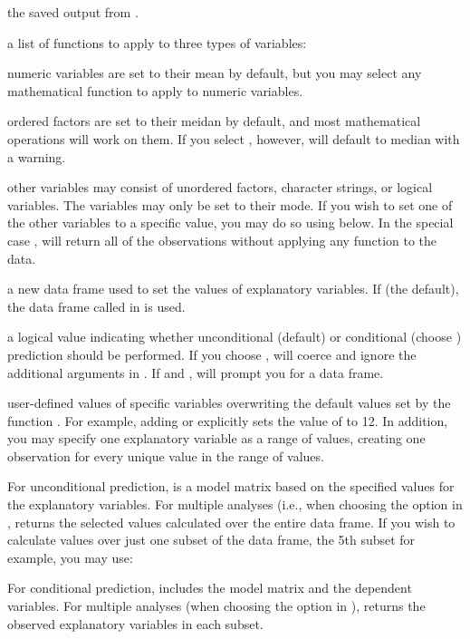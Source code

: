 \begin{Arguments}
\begin{ldescription}
\item[\code{object}] the saved output from . 
\item[\code{fn}] a list of functions to apply to three types of variables:
\item[numeric]  variables are set to their mean by
default, but you may select any mathematical function to apply to
numeric variables.
\item[ordered]  factors are set to their meidan by
default, and most mathematical operations will work on them.  If
you select , however,  will
default to median with a warning.
\item[other] variables may consist of unordered factors, character
strings, or logical variables.  The  variables may
only be set to their mode.  If you wish to set one of the other
variables to a specific value, you may do so using 
below. 
In the special case ,  will return all
of the observations without applying any function to the data.  
\item[\code{data}] a new data frame used to set the values of
explanatory variables. If  (the default), the
data frame called in  is used. 
\item[\code{cond}] a logical value indicating whether unconditional
(default) or conditional (choose ) prediction
should be performed.  If you choose , 
will coerce  and ignore the additional arguments in 
.  If  and ,
 will prompt you for a data frame.  
\item[\code{...}] user-defined values of specific variables
overwriting the default values set by the function .  For
example, adding  or 
explicitly sets the value of  to 12.  In addition, you may
specify one explanatory variable as a range of values, creating one
observation for every unique value in the range of values. 
\end{ldescription}
\end{Arguments}
\begin{Value}
For unconditional prediction,  is a model matrix based
on the specified values for the explanatory variables.  For multiple
analyses (i.e., when choosing the  option in ,
 returns the selected values calculated over the entire
data frame.  If you wish to calculate values over just one subset of
the data frame, the 5th subset for example, you may use:  

For conditional prediction,  includes the model matrix
and the dependent variables.  For multiple analyses (when choosing
the  option in ),  returns the
observed explanatory variables in each subset.
\end{Value}
